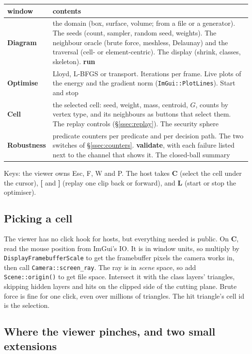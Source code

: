 \documentclass[11pt,a4paper]{article}
\newcommand{\code}[1]{\texttt{#1}}          %
\newcommand{\secref}[1]{\S\ref{#1}}
\begin{document}
{\small
\begin{xltabular}{\linewidth}{@{}P{2.2cm} L@{}}
\toprule
window & contents \\
\midrule
\endhead
\textbf{Diagram}
  & the domain (box, surface, volume; from a file or a generator). The seeds (count, sampler,
    random seed, weights). The neighbour oracle (brute force, meshless, Delaunay) and the
    traversal (cell- or element-centric). The display (shrink, classes, skeleton).
    \textbf{run} \\
\textbf{Optimise}
  & Lloyd, L-BFGS or transport. Iterations per frame. Live plots of the energy and the gradient
    norm (\code{ImGui::PlotLines}). Start and stop \\
\textbf{Cell}
  & the selected cell: seed, weight, mass, centroid, $G$, counts by vertex type, and its
    neighbours as buttons that select them. The replay controls (\secref{ssec:replay}). The
    security sphere \\
\textbf{Robustness}
  & predicate counters per predicate and per decision path. The two switches of
    \secref{ssec:counters}. \textbf{validate}, with each failure listed next to the channel
    that shows it. The closed-ball summary \\
\bottomrule
\end{xltabular}}

Keys: the viewer owns Esc, F, W and P. The host takes \textbf{C} (select the cell under the
cursor), \textbf{[} and \textbf{]} (replay one clip back or forward), and \textbf{L} (start or
stop the optimiser).

\subsection{Picking a cell}\label{ssec:picking}

The viewer has no click hook for hosts, but everything needed is public. On \textbf{C}, read the
mouse position from ImGui's IO. It is in window units, so multiply by
\code{DisplayFramebufferScale} to get the framebuffer pixels the camera works in, then call
\code{Camera::screen\_ray}. The ray is in \emph{scene} space, so add \code{Scene::origin()} to
get file space. Intersect it with the class layers' triangles, skipping hidden layers and hits on
the clipped side of the cutting plane. Brute force is fine for one click, even over millions of
triangles. The hit triangle's cell id is the selection.

\subsection{Where the viewer pinches, and two small extensions}\label{ssec:extensions}
\end{document}
